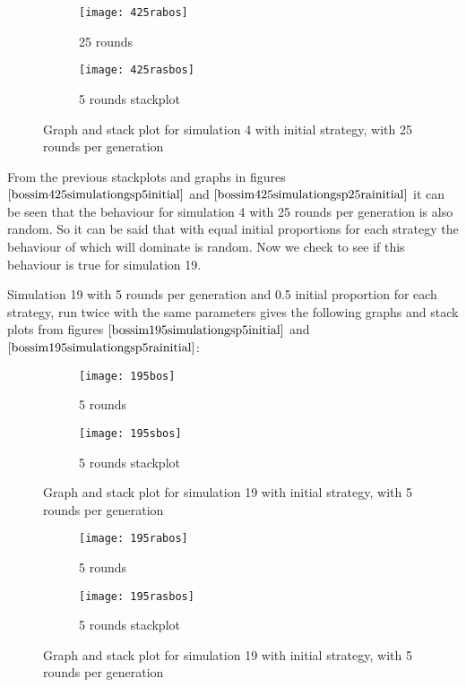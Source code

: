 \begin{figure}[H]       
    \centering
    \begin{subfigure}[b]{0.3\textwidth}
	\centering
	{\texttt{[image: 425rabos]}}   
    	\caption{25 rounds}
	\label{fig:bossim425rabos}
    \end{subfigure}
    \hfill
    \begin{subfigure}[b]{0.3\textwidth}
	\centering
	{\texttt{[image: 425rasbos]}}   
    	\caption{5 rounds stackplot}
	\label{fig:bossim425rasbos}
    \end{subfigure}
    \caption{Graph and stack plot for simulation 4 with initial strategy, with 25 rounds per generation}
    \label{bossim425simulationgsp25rainitial}
\end{figure}
From the previous stackplots and graphs in figures $\ref{bossim425simulationgsp5initial}$ and $\ref{bossim425simulationgsp25rainitial}$ it can be seen that the behaviour for simulation 4 with 25 rounds per generation is also random. So it  can be said that with equal initial proportions for each strategy the behaviour of which will dominate is random. Now we check to  see if this behaviour is true for simulation 19. 

Simulation 19 with 5 rounds per generation and 0.5 initial proportion for each strategy, run twice with the same parameters gives the following graphs and stack plots from figures $\ref{bossim195simulationgsp5initial}$ and $\ref{bossim195simulationgsp5rainitial}$:
\begin{figure}[H]       
    \centering
    \begin{subfigure}[b]{0.3\textwidth}
	\centering
	{\texttt{[image: 195bos]}}   
    	\caption{5 rounds}
	\label{fig:bossim195r5}
    \end{subfigure}
    \hfill
    \begin{subfigure}[b]{0.3\textwidth}
	\centering
	{\texttt{[image: 195sbos]}}   
    	\caption{5 rounds stackplot}
	\label{fig:bossim195rs5}
    \end{subfigure}
    \caption{Graph and stack plot for simulation 19 with initial strategy, with 5 rounds per generation}
    \label{bossim195simulationgsp5initial}
\end{figure}

\begin{figure}[H]       
    \centering
    \begin{subfigure}[b]{0.3\textwidth}
	\centering
	{\texttt{[image: 195rabos]}}   
    	\caption{5 rounds}
	\label{fig:bossim195ra}
    \end{subfigure}
    \hfill
    \begin{subfigure}[b]{0.3\textwidth}
	\centering
	{\texttt{[image: 195rasbos]}}   
    	\caption{5 rounds stackplot}
	\label{fig:bossim195ras}
    \end{subfigure}
    \caption{Graph and stack plot for simulation 19 with initial strategy, with 5 rounds per generation}
    \label{bossim195simulationgsp5rainitial}
\end{figure}

